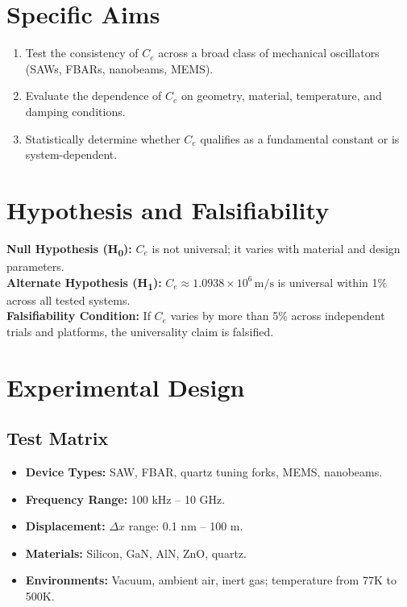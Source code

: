 \documentclass[11pt]{article}
\begin{document}
        \section{Specific Aims}
        \begin{enumerate}[label=\textbf{Aim \arabic*.}]
            \item Test the consistency of \( C_e \) across a broad class of mechanical oscillators (SAWs, FBARs, nanobeams, MEMS).
            \item Evaluate the dependence of \( C_e \) on geometry, material, temperature, and damping conditions.
            \item Statistically determine whether \( C_e \) qualifies as a fundamental constant or is system-dependent.
        \end{enumerate}

        \section{Hypothesis and Falsifiability}
        \textbf{Null Hypothesis (H\textsubscript{0}):} \( C_e \) is not universal; it varies with material and design parameters.\\
        \textbf{Alternate Hypothesis (H\textsubscript{1}):} \( C_e \approx 1.0938 \times 10^6 \, \text{m/s} \) is universal within 1\% across all tested systems.\\

        \noindent\textbf{Falsifiability Condition:} If \( C_e \) varies by more than 5\% across independent trials and platforms, the universality claim is falsified.

        \section{Experimental Design}

        \subsection*{Test Matrix}
        \begin{itemize}
            \item \textbf{Device Types:} SAW, FBAR, quartz tuning forks, MEMS, nanobeams.
            \item \textbf{Frequency Range:} 100 kHz -- 10 GHz.
            \item \textbf{Displacement:} \( \Delta x \) range: 0.1 nm -- 100 \textmu m.
            \item \textbf{Materials:} Silicon, GaN, AlN, ZnO, quartz.
            \item \textbf{Environments:} Vacuum, ambient air, inert gas; temperature from 77K to 500K.
        \end{itemize}
\end{document}
